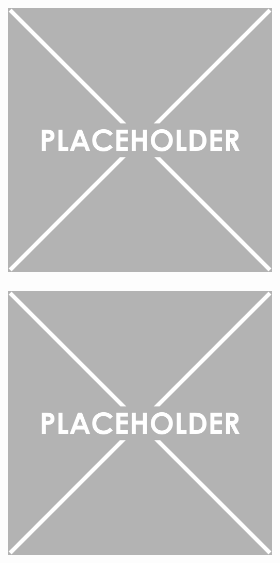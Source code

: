 \documentclass{article}
\begin{document}
\graphicspath{{./figures/}}

\begin{figure}[ht] 
\centering
    \begin{subfigure}{0.2\textwidth}
        \centering	
        \begin{subfigure}{\textwidth}
	    \centering
            \includegraphics[width=\linewidth]{placeholder.png}
    	\end{subfigure}%

    	\begin{subfigure}{\textwidth} 
	    \centering
            \includegraphics[width=\linewidth]{placeholder.png}
    	\end{subfigure}%
    

\end{subfigure}
\end{figure}
\end{document}
